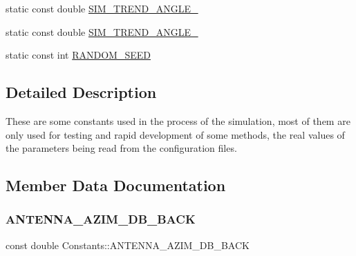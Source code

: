 \begin{DoxyCompactItemize}
\item 
static const double \hyperlink{class_constants_a97968377c9a3cf2995c37aa63d3dd505}{S\+I\+M\+\_\+\+T\+R\+E\+N\+D\+\_\+\+A\+N\+G\+L\+E\+\_}
\item 
static const double \hyperlink{class_constants_a1ec9cdffb9c58a2ff1cb60f64b056835}{S\+I\+M\+\_\+\+T\+R\+E\+N\+D\+\_\+\+A\+N\+G\+L\+E\+\_}
\item 
static const int \hyperlink{class_constants_ac80eccfaa8e498ad3fc6ea0a2c3d38a0}{R\+A\+N\+D\+O\+M\+\_\+\+S\+E\+ED}
\end{DoxyCompactItemize}


\subsection{Detailed Description}
These are some constants used in the process of the simulation, most of them are only used for testing and rapid development of some methods, the real values of the parameters being read from the configuration files. 

\subsection{Member Data Documentation}
\mbox{\label{class_constants_aa2030f2c0ec89fb7cc06b31bbb50793d}} 
\subsubsection{\texorpdfstring{A\+N\+T\+E\+N\+N\+A\+\_\+\+A\+Z\+I\+M\+\_\+\+D\+B\+\_\+\+B\+A\+CK}{ANTENNA\_AZIM\_DB\_BACK}}
{\footnotesize\ttfamily const double Constants\+::\+A\+N\+T\+E\+N\+N\+A\+\_\+\+A\+Z\+I\+M\+\_\+\+D\+B\+\_\+\+B\+A\+CK\hspace{0.3cm}{\ttfamily [static]}}

\mbox{\label{class_constants_a4e4a0a48ad06c458ae4f3e6d0e4e6608}} 
